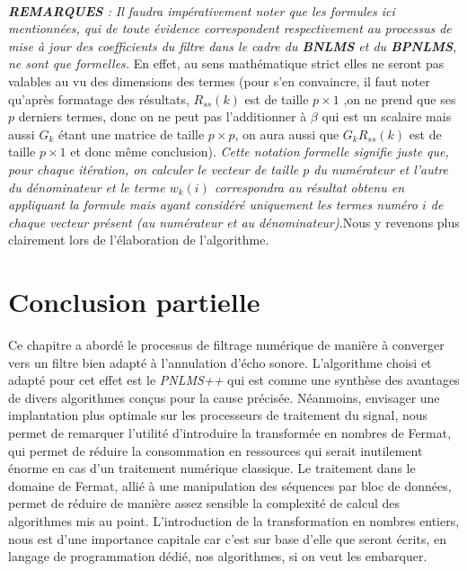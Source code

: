 \paragraph{}
\emph{\textbf{REMARQUES} : Il faudra impérativement noter que les formules ici mentionnées, qui de toute évidence correspondent respectivement au processus de mise à jour des coefficients du filtre dans le cadre du \textbf{BNLMS} et du \textbf{BPNLMS}, ne sont que formelles.} En effet, au sens mathématique strict elles ne seront pas valables au vu des dimensions des termes (pour s'en convaincre, il faut noter qu'après formatage des résultats, $ R_{ss}(k) $ est de taille 	$ p\times 1 $ ,on ne prend que ses $ p $ derniers termes, donc on ne peut pas l'additionner à $ \beta $ qui est un scalaire mais aussi $ G_{k} $ étant une matrice de taille $ p\times p $, on aura aussi que $ G_{k}R_{ss}(k) $ est de taille $ p\times 1 $ et donc même conclusion). \emph{Cette notation formelle signifie juste que, pour chaque itération, on calculer le vecteur de taille $ p $ du numérateur et l'autre du dénominateur et le terme $ w_{k}(i) $ correspondra au résultat obtenu en appliquant la formule mais ayant considéré uniquement les termes numéro $ i $ de chaque vecteur présent (au numérateur et au dénominateur)}.Nous y revenons plus clairement lors de l'élaboration de l'algorithme.
\section{Conclusion partielle}
Ce chapitre a abordé le processus de filtrage numérique de manière à converger vers un filtre bien adapté à l'annulation d'écho sonore. L'algorithme choisi et adapté pour cet effet est le \emph{PNLMS++} qui est comme une synthèse des avantages de divers algorithmes conçus pour la cause précisée.
Néanmoins, envisager une implantation plus optimale sur les processeurs de traitement du signal, nous permet de remarquer l'utilité d'introduire la transformée en nombres de Fermat, qui permet de réduire la consommation en ressources qui serait inutilement énorme en cas d'un traitement numérique classique.
Le traitement dans le domaine de Fermat, allié à une manipulation des séquences par bloc de données, permet de réduire de manière assez sensible la complexité de calcul des algorithmes mis au point. L'introduction de la transformation en nombres entiers, nous est d'une importance capitale car c'est sur base d'elle que seront écrits, en langage de programmation dédié, nos algorithmes, si on veut les embarquer.